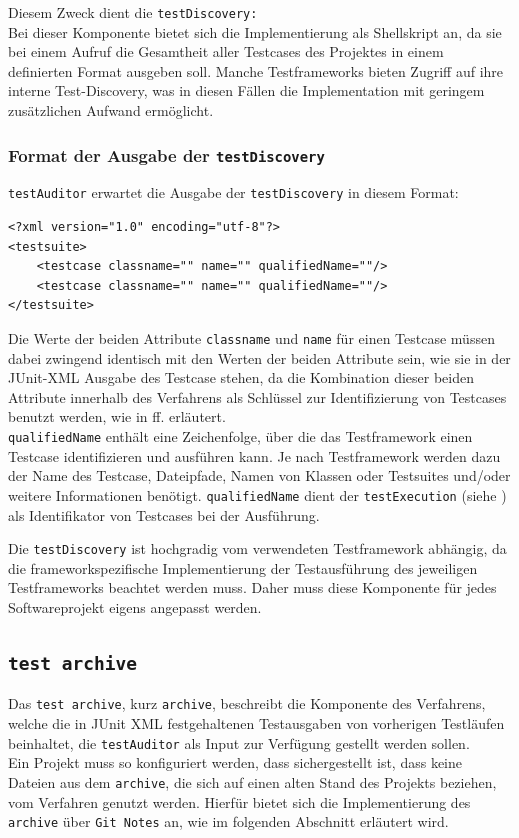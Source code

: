 Diesem Zweck dient die \texttt{testDiscovery:}\\
Bei dieser Komponente bietet sich die Implementierung als Shellskript an, da sie bei einem Aufruf die Gesamtheit aller Testcases des Projektes in einem definierten Format ausgeben soll. Manche Testframeworks bieten Zugriff auf ihre interne Test-Discovery, was in diesen Fällen die Implementation mit geringem zusätzlichen Aufwand ermöglicht. 

\subsubsection{Format der Ausgabe der \texttt{testDiscovery}}\label{chap:Komponente_testDiscovery_format}
\texttt{testAuditor} erwartet die Ausgabe der \texttt{testDiscovery} in diesem Format:
\begin{lstlisting}[caption={Format der \texttt{testDiscovery}}, label={format_testDiscovery}]
<?xml version="1.0" encoding="utf-8"?>
<testsuite>
    <testcase classname="" name="" qualifiedName=""/>
    <testcase classname="" name="" qualifiedName=""/>
</testsuite>
\end{lstlisting}
Die Werte der beiden Attribute \texttt{classname} und \texttt{name} für einen Testcase müssen dabei zwingend identisch mit den Werten der beiden Attribute sein, wie sie in der JUnit-XML Ausgabe des Testcase stehen, da die Kombination dieser beiden Attribute innerhalb des Verfahrens als Schlüssel zur Identifizierung von Testcases benutzt werden, wie in  ff. erläutert.\\
\texttt{qualifiedName} enthält eine Zeichenfolge, über die das Testframework einen Testcase identifizieren und ausführen kann. Je nach Testframework werden dazu der Name des Testcase, Dateipfade, Namen von Klassen oder Testsuites und/oder weitere Informationen benötigt. \texttt{qualifiedName} dient der \texttt{testExecution} (siehe ) als Identifikator von Testcases bei der Ausführung.

Die \texttt{testDiscovery} ist hochgradig vom verwendeten Testframework abhängig, da die frameworkspezifische Implementierung der Testausführung des jeweiligen Testframeworks beachtet werden muss. Daher muss diese Komponente für jedes Softwareprojekt eigens angepasst werden.

\subsection{\texttt{test archive}}\label{chap:Komponente_archive}
Das \texttt{test archive}, kurz \texttt{archive}, beschreibt die Komponente des Verfahrens, welche die in JUnit XML festgehaltenen Testausgaben von vorherigen Testläufen beinhaltet, die \texttt{testAuditor} als Input zur Verfügung gestellt werden sollen.\\
Ein Projekt muss so konfiguriert werden, dass sichergestellt ist, dass keine Dateien aus dem \texttt{archive}, die sich auf einen alten Stand des Projekts beziehen, vom Verfahren genutzt werden. Hierfür bietet sich die Implementierung des \texttt{archive} über \texttt{Git Notes} an, wie im folgenden Abschnitt erläutert wird.

